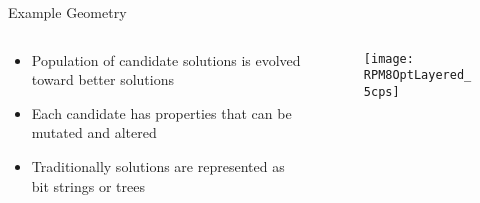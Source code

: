 \begin{frame}{Example Geometry}
\begin{columns}[onlytextwidth]
  \begin{column}{0.45\textwidth}
    \small
    \begin{itemize}
      \item Population of candidate solutions is evolved toward better solutions
      \item Each candidate has properties that can be mutated and altered
      \item Traditionally solutions are represented as bit strings or trees
    \end{itemize}
    \end{column}
  \begin{column}{0.45\textwidth}
    \begin{figure}
      \texttt{[image: RPM8OptLayered\_5cps]}
    \end{figure}
  \end{column}
\end{columns}
\hyperlink{GAMethodExtended}{}
\end{frame}
